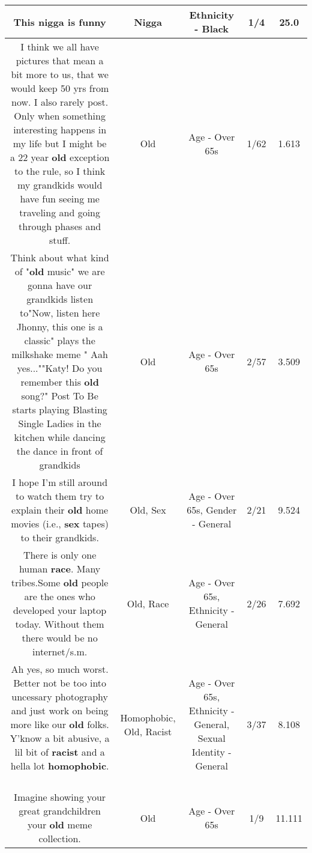 \documentclass[11pt]{article}
\newlength\mylength
\begin{document}
\begin{center}
\begin{longtable}{|C{.65\mylength}|C{.30\mylength}|C{.12\mylength}|C{.12\mylength}|C{.12\mylength}|}
  \small This \textbf{nigga} is funny\normalsize   & Nigga & Ethnicity - Black & 1/4 & 25.0 \\  \hline
  \small I think we all have pictures that mean a bit more to us, that we would keep 50 yrs from now. I also rarely post. Only when something interesting happens in my life but I might be a 22 year \textbf{old} exception to the rule, so I think my grandkids would have fun seeing me traveling and going through phases and stuff.\normalsize   & Old & Age - Over 65s & 1/62 & 1.613 \\  \hline
  \small Think about what kind of "\textbf{old} music" we are gonna have our grandkids listen to"Now, listen here Jhonny, this one is a classic" plays the milkshake meme " Aah yes...""Katy! Do you remember this \textbf{old} song?" Post To Be starts playing Blasting Single Ladies in the kitchen while dancing the dance in front of grandkids\normalsize   & Old & Age - Over 65s & 2/57 & 3.509 \\  \hline
  \small I hope I'm still around to watch them try to explain their \textbf{old} home movies (i.e., \textbf{sex} tapes) to their grandkids.\normalsize   & Old, Sex & Age - Over 65s, Gender - General & 2/21 & 9.524 \\  \hline
  \small There is only one human \textbf{race}. Many tribes.Some \textbf{old} people are the ones who developed your laptop today.  Without them there would be no internet/s.m.\normalsize   & Old, Race & Age - Over 65s, Ethnicity - General & 2/26 & 7.692 \\  \hline
  \small Ah yes, so much worst. Better not be too into uncessary photography and just work on being more like our \textbf{old} folks. Y'know a bit abusive, a lil bit of \textbf{racist} and a hella lot \textbf{homophobic}. 💁\normalsize   & Homophobic, Old, Racist & Age - Over 65s, Ethnicity - General, Sexual Identity - General & 3/37 & 8.108 \\  \hline
  \small Imagine showing your great grandchildren your \textbf{old} meme collection.\normalsize   & Old & Age - Over 65s & 1/9 & 11.111 \\  \hline

\end{longtable}
\end{center}
\end{document}

